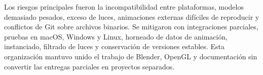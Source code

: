 \documentclass[letter,12pt]{article}
\begin{document}
	Los riesgos principales fueron la incompatibilidad entre plataformas, modelos
	demasiado pesados, exceso de luces, animaciones externas difíciles de reproducir
	y conflictos de Git sobre archivos binarios. Se mitigaron con integraciones
	parciales, pruebas en macOS, Windows y Linux, horneado de datos de animación,
	instanciado, filtrado de luces y conservación de versiones estables. Esta
	organización mantuvo unido el trabajo de Blender, OpenGL y documentación sin
	convertir las entregas parciales en proyectos separados.

\end{document}

